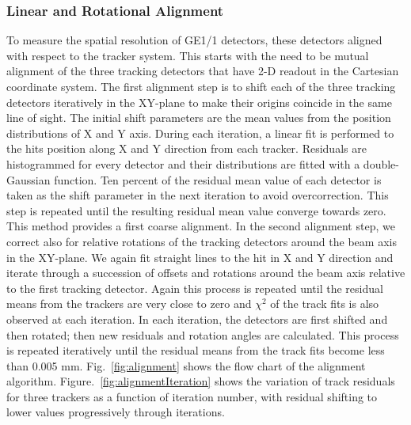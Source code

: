 \subsubsection{Linear and Rotational Alignment}
To measure the spatial resolution of GE1/1 detectors, these detectors aligned with respect to the tracker system.
This starts with the need to be mutual alignment of the three tracking detectors that have 2-D readout in the Cartesian coordinate system.
The first alignment step is to shift each of the three tracking detectors iteratively in the XY-plane to make their origins coincide in the same line of sight.
The initial shift parameters are the mean values from the position distributions  of X and Y axis.
During each iteration, a linear fit is performed to the hits position along X and Y direction from each tracker.
Residuals are histogrammed for every detector and their distributions are fitted with a double-Gaussian function.
Ten percent of the residual mean value of each detector is taken as the shift parameter in the next iteration to avoid overcorrection.
This step is repeated until the resulting residual mean value converge towards zero.
This method provides a first coarse alignment.
In the second alignment step, we correct also for relative rotations of the tracking detectors around the beam axis in the XY-plane.
We again fit straight lines to the hit in X and Y direction and iterate through a succession of offsets and rotations around the beam axis relative to the first tracking detector.
Again this process is repeated until the residual means from the trackers are very close to zero and $\chi^2$ of the track fits is also observed at each iteration.
In each iteration, the detectors are first shifted and then rotated; then new residuals and rotation angles are calculated.
This process is repeated iteratively until the residual means from the track fits become less than 0.005 mm. Fig.~\ref{fig:alignment} shows the flow chart of the alignment algorithm.
Figure.~\ref{fig:alignmentIteration} shows the variation of track residuals for three trackers as a function of iteration number, with residual shifting to lower values progressively through iterations.
